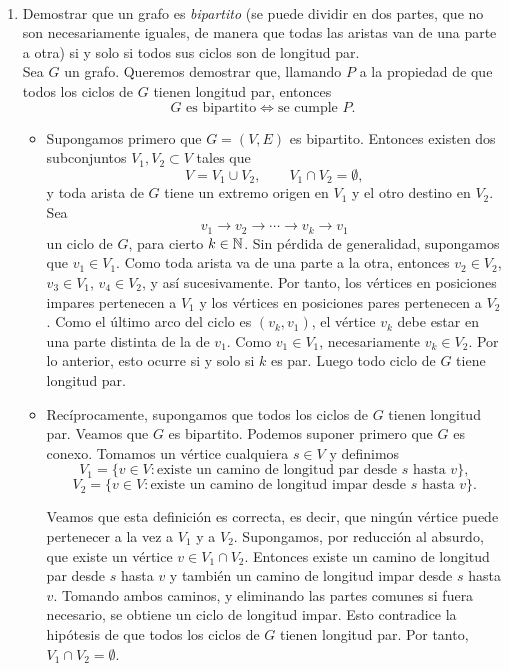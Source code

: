 \begin{ejercicio}~
    \begin{enumerate}
        \item[(a)] Demostrar que un grafo es \textit{bipartito} (se puede dividir en dos partes, que no son necesariamente iguales, de manera que 
        todas las aristas van de una parte a otra) si y solo si todos sus ciclos son de longitud par. \\

        Sea $G$ un grafo. Queremos demostrar que, llamando $P$ a la propiedad de que todos los ciclos de $G$ tienen longitud par, entonces
        $$
        G \text{ es bipartito} \Longleftrightarrow \text{se cumple } P.
        $$

        \begin{itemize}
            \item[$\Longrightarrow)$] Supongamos primero que $G=(V,E)$ es bipartito. Entonces existen dos subconjuntos $V_1,V_2 \subset V$ tales que
            $$
            V=V_1\cup V_2,\qquad V_1\cap V_2=\emptyset,
            $$
            y toda arista de $G$ tiene un extremo origen en $V_1$ y el otro destino en $V_2$. Sea
            $$
            v_1\to v_2\to \cdots \to v_k\to v_1
            $$
            un ciclo de $G$, para cierto $k \in \mathbb{N}$. Sin pérdida de generalidad, supongamos que $v_1\in V_1$. Como toda arista va de una parte a la otra, entonces $v_2\in V_2$, $v_3\in V_1$, $v_4\in V_2$, y así sucesivamente. Por tanto, los vértices en posiciones impares pertenecen a $V_1$ y los vértices en posiciones pares pertenecen a $V_2$.
            Como el último arco del ciclo es $(v_k,v_1)$, el vértice $v_k$ debe estar en una parte distinta de la de $v_1$. Como $v_1\in V_1$, 
            necesariamente $v_k\in V_2$. Por lo anterior, esto ocurre si y solo si $k$ es par. Luego todo ciclo de $G$ tiene longitud par.

            \item[$(\Longleftarrow$] Recíprocamente, supongamos que todos los ciclos de $G$ tienen longitud par. Veamos que $G$ es bipartito.
            Podemos suponer primero que $G$ es conexo. Tomamos un vértice cualquiera $s\in V$ y definimos
            $$
            V_1=\{v\in V : \text{existe un camino de longitud par desde } s \text{ hasta } v\},
            $$
            $$
            V_2=\{v\in V : \text{existe un camino de longitud impar desde } s \text{ hasta } v\}.
            $$

            Veamos que esta definición es correcta, es decir, que ningún vértice puede pertenecer a la vez a $V_1$ y a $V_2$. Supongamos, por reducción al absurdo, que existe un vértice $v\in V_1\cap V_2$. Entonces existe un camino de longitud par desde $s$ hasta $v$ y también un camino de longitud impar desde $s$ hasta $v$.
            Tomando ambos caminos, y eliminando las partes comunes si fuera necesario, se obtiene un ciclo de longitud impar. Esto contradice la hipótesis de que todos los ciclos de $G$ tienen longitud par. Por tanto, $V_1\cap V_2=\emptyset$.


\end{itemize}
\end{enumerate}
\end{ejercicio}
